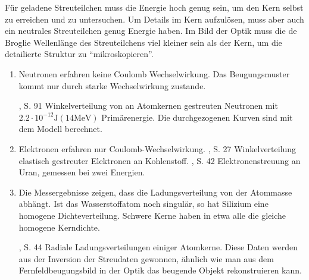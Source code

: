 Für geladene Streuteilchen muss die Energie hoch genug sein, um den Kern selbst
zu erreichen und zu untersuchen. Um Details im Kern aufzulösen, muss aber auch
ein neutrales Streuteilchen genug Energie haben. Im Bild der Optik muss die de
Broglie Wellenlänge des Streuteilchens viel kleiner sein als der Kern, um die
detailierte Struktur zu ``mikroskopieren''.
\begin{bspn}
\begin{enumerate}[label=\arabic{*}.)]
  \item Neutronen erfahren keine Coulomb Wechselwirkung. Das Beugungsmuster
  kommt nur durch starke Wechselwirkung zustande.

%
	{\Stierstadt, S. 91}%
	{Winkelverteilung von an Atomkernen gestreuten Neutronen mit $2.2\cdot
	10^{-12}\mathrm{J} (14\mathrm{MeV})$ Primärenergie. Die durchgezogenen Kurven
	sind mit dem Modell berechnet.}

\item Elektronen erfahren nur Coulomb-Wechselwirkung.
%
	{\KuckukKern, S. 27}%
	{Winkelverteilung elastisch gestreuter Elektronen an Kohlenstoff.}
%
	{\BethgeWalter, S. 42}%
	{Elektronenstreuung an Uran, gemessen bei zwei Energien.}

\item Die Messergebnisse zeigen, dass die Ladungsverteilung von der
Atommasse abhängt. Ist das Wasserstoffatom noch singulär, so hat Silizium
eine homogene Dichteverteilung. Schwere Kerne haben in etwa alle die gleiche
homogene Kerndichte.

%
	{\BethgeWalter, S. 44}%
	{\label{fig:radlad}Radiale Ladungsverteilungen einiger Atomkerne. Diese Daten
	werden aus der Inversion der Streudaten gewonnen, ähnlich wie man aus dem
	Fernfeldbeugungsbild in der Optik das beugende Objekt rekonstruieren kann.}

\end{enumerate}
\end{bspn}
